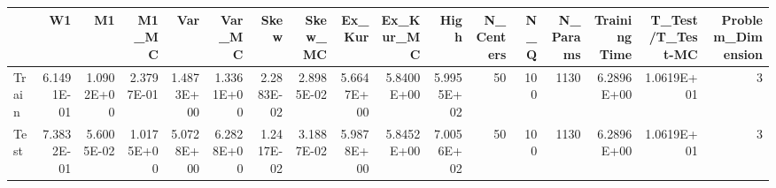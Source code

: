 \begin{tabular}{lrrrrrrrrrrrrrrrr}
\toprule
{} &         W1 &         M1 &      M1\_MC &        Var &     Var\_MC &       Skew &    Skew\_MC &     Ex\_Kur &  Ex\_Kur\_MC &       High &  N\_Centers &  N\_Q &  N\_Params &  Training Time &  T\_Test/T\_Test-MC &  Problem\_Dimension \\
\midrule
Train & 6.1491E-01 & 1.0902E+00 & 2.3797E-01 & 1.4873E+00 & 1.3361E+00 & 2.2883E-02 & 2.8985E-02 & 5.6647E+00 & 5.8400E+00 & 5.9955E+02 &         50 &  100 &      1130 &     6.2896E+00 &        1.0619E+01 &                  3 \\
Test  & 7.3832E-01 & 5.6005E-02 & 1.0175E+00 & 5.0728E+00 & 6.2828E+00 & 1.2417E-02 & 3.1887E-02 & 5.9878E+00 & 5.8452E+00 & 7.0056E+02 &         50 &  100 &      1130 &     6.2896E+00 &        1.0619E+01 &                  3 \\
\bottomrule
\end{tabular}
